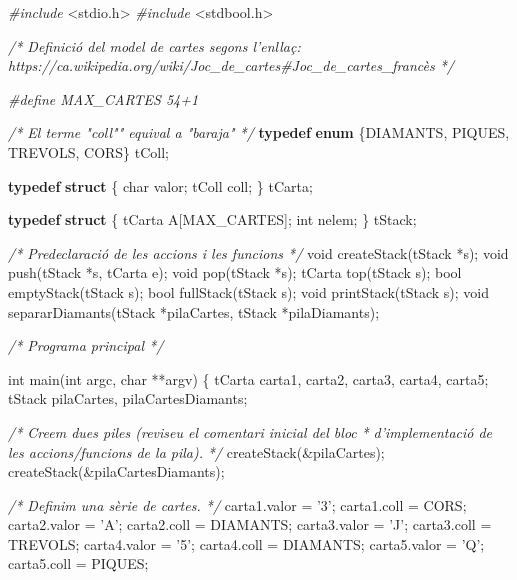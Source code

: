 \documentclass[]{book}
\newenvironment{Shaded}{\begin{snugshade}}{\end{snugshade}}
\newcommand{\KeywordTok}[1]{\textcolor[rgb]{0.13,0.29,0.53}{\textbf{#1}}}
\newcommand{\DataTypeTok}[1]{\textcolor[rgb]{0.13,0.29,0.53}{#1}}
\newcommand{\CharTok}[1]{\textcolor[rgb]{0.31,0.60,0.02}{#1}}
\newcommand{\ImportTok}[1]{#1}
\newcommand{\CommentTok}[1]{\textcolor[rgb]{0.56,0.35,0.01}{\textit{#1}}}
\newcommand{\PreprocessorTok}[1]{\textcolor[rgb]{0.56,0.35,0.01}{\textit{#1}}}
\newcommand{\NormalTok}[1]{#1}
\begin{document}
\begin{Shaded}
\begin{Highlighting}[]
\PreprocessorTok{#include }\ImportTok{<stdio.h>}
\PreprocessorTok{#include }\ImportTok{<stdbool.h>}

\CommentTok{/* Definició del model de cartes segons l'enllaç:}
\CommentTok{   https://ca.wikipedia.org/wiki/Joc_de_cartes#Joc_de_cartes_francès */}

\PreprocessorTok{#define MAX_CARTES 54+1}

\CommentTok{/* El terme "coll"" equival a "baraja" */}
\KeywordTok{typedef} \KeywordTok{enum}\NormalTok{ \{DIAMANTS, PIQUES, TREVOLS, CORS\} tColl;}

\KeywordTok{typedef} \KeywordTok{struct}\NormalTok{ \{}
    \DataTypeTok{char}\NormalTok{ valor;}
\NormalTok{    tColl coll;}
\NormalTok{\} tCarta;}

\KeywordTok{typedef} \KeywordTok{struct}\NormalTok{ \{}
\NormalTok{    tCarta A[MAX_CARTES];}
    \DataTypeTok{int}\NormalTok{ nelem;}
\NormalTok{\} tStack;}

\CommentTok{/* Predeclaració de les accions i les funcions */}
\DataTypeTok{void}\NormalTok{ createStack(tStack *s);}
\DataTypeTok{void}\NormalTok{ push(tStack *s, tCarta e);}
\DataTypeTok{void}\NormalTok{ pop(tStack *s);}
\NormalTok{tCarta top(tStack s);}
\NormalTok{bool emptyStack(tStack s);}
\NormalTok{bool fullStack(tStack s);}
\DataTypeTok{void}\NormalTok{ printStack(tStack s);}
\DataTypeTok{void}\NormalTok{ separarDiamants(tStack *pilaCartes, tStack *pilaDiamants);}

\CommentTok{/* Programa principal */}

\DataTypeTok{int}\NormalTok{ main(}\DataTypeTok{int}\NormalTok{ argc, }\DataTypeTok{char}\NormalTok{ **argv) \{}
\NormalTok{    tCarta carta1, carta2, carta3, carta4, carta5;}
\NormalTok{    tStack pilaCartes, pilaCartesDiamants;}
    
    \CommentTok{/* Creem dues piles (reviseu el comentari inicial del bloc}
\CommentTok{     * d'implementació de les accions/funcions de la pila). }
\CommentTok{     */}
\NormalTok{    createStack(&pilaCartes);}
\NormalTok{    createStack(&pilaCartesDiamants);}
    
    \CommentTok{/* Definim una sèrie de cartes. */}
\NormalTok{    carta1.valor = }\CharTok{'3'}\NormalTok{;}
\NormalTok{    carta1.coll = CORS;}
\NormalTok{    carta2.valor = }\CharTok{'A'}\NormalTok{;}
\NormalTok{    carta2.coll = DIAMANTS;}
\NormalTok{    carta3.valor = }\CharTok{'J'}\NormalTok{;}
\NormalTok{    carta3.coll = TREVOLS;}
\NormalTok{    carta4.valor = }\CharTok{'5'}\NormalTok{;}
\NormalTok{    carta4.coll = DIAMANTS;}
\NormalTok{    carta5.valor = }\CharTok{'Q'}\NormalTok{;}
\NormalTok{    carta5.coll = PIQUES;}
    

\end{Highlighting}
\end{Shaded}
\end{document}
